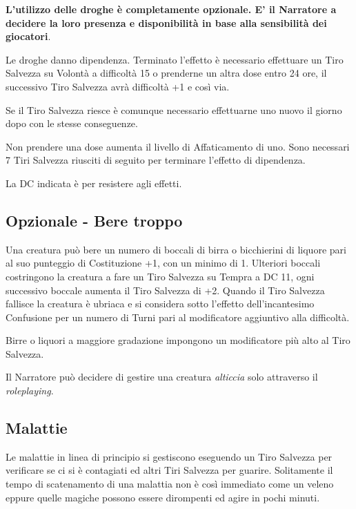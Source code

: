 \begin{multicols}{2}

\medskip

\textbf{L'utilizzo delle droghe è completamente opzionale. E' il Narratore a decidere la loro presenza e disponibilità in base alla sensibilità dei giocatori}.

Le droghe danno dipendenza. Terminato l'effetto è necessario effettuare un Tiro Salvezza su Volontà a difficoltà 15 o prenderne un altra dose entro 24 ore, il successivo Tiro Salvezza avrà difficoltà +1 e così via.

Se il Tiro Salvezza riesce è comunque necessario effettuarne uno nuovo il giorno dopo con le stesse conseguenze.

Non prendere una dose aumenta il livello di Affaticamento di uno. Sono necessari 7 Tiri Salvezza riusciti di seguito per terminare l'effetto di dipendenza.

La DC indicata è per resistere agli effetti.

\subsection{Opzionale - Bere troppo}\hypertarget{alcolismo}{}\label{beretroppo}

Una creatura può bere un numero di boccali di birra o bicchierini di liquore pari al suo punteggio di Costituzione +1, con un minimo di 1. Ulteriori boccali costringono la creatura a fare un Tiro Salvezza su Tempra a DC 11, ogni successivo boccale aumenta il Tiro Salvezza di +2. Quando il Tiro Salvezza fallisce la creatura è ubriaca e si considera sotto l'effetto dell'incantesimo Confusione per un numero di Turni pari al modificatore aggiuntivo alla difficoltà.

Birre o liquori a maggiore gradazione impongono un modificatore più alto al Tiro Salvezza.

Il Narratore può decidere di gestire una creatura \emph{alticcia} solo attraverso il \emph{roleplaying}.

\subsection{Malattie}\hypertarget{malattie}{}\label{malattie}

Le malattie in linea di principio si gestiscono eseguendo un Tiro Salvezza per verificare se ci si è contagiati ed altri Tiri Salvezza per guarire.
Solitamente il tempo di scatenamento di una malattia non è così immediato come un veleno eppure quelle magiche possono essere dirompenti ed agire in pochi minuti.


\end{multicols}
